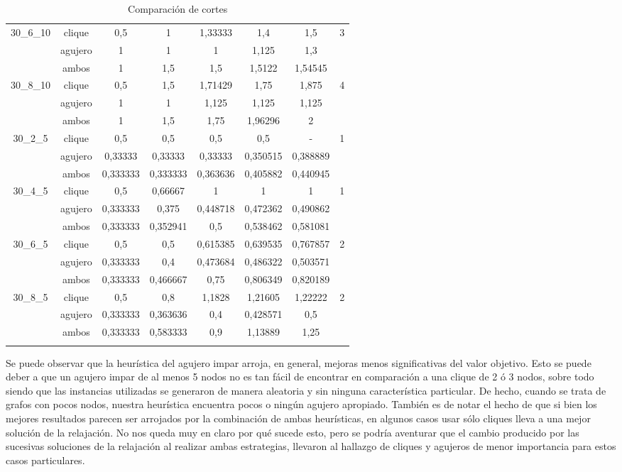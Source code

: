 \documentclass[a4paper]{article}
\begin{document}
\begin{center}
\begin{longtable}{|c|c|c|c|c|c|c|c|}
\hline
30_6_10&clique&0,5&1&1,33333&1,4&1,5&3\\
\cline{2-7}
&agujero&1&1&1&1,125&1,3&\\
\cline{2-7}
&ambos&1&1,5&1,5&1,5122&1,54545&\\
\hline
30_8_10&clique&0,5&1,5&1,71429&1,75&1,875&4\\
\cline{2-7}
&agujero&1&1&1,125&1,125&1,125&\\
\cline{2-7}
&ambos&1&1,5&1,75&1,96296&2&\\
\hline
30_2_5&clique&0,5&0,5&0,5&0,5&-&1\\
\cline{2-7}
&agujero&0,33333&0,33333&0,33333&0,350515&0,388889&\\
\cline{2-7}
&ambos&0,333333&0,333333&0,363636&0,405882&0,440945&\\
\hline
30_4_5&clique&0,5&0,66667&1&1&1&1\\
\cline{2-7}
&agujero&0,333333&0,375&0,448718&0,472362&0,490862&\\
\cline{2-7}
&ambos&0,333333&0,352941&0,5&0,538462&0,581081&\\
\hline
30_6_5&clique&0,5&0,5&0,615385&0,639535&0,767857&2\\
\cline{2-7}
&agujero&0,333333&0,4&0,473684&0,486322&0,503571&\\
\cline{2-7}
&ambos&0,333333&0,466667&0,75&0,806349&0,820189&\\
\hline
30_8_5&clique&0,5&0,8&1,1828&1,21605&1,22222&2\\
\cline{2-7}
&agujero&0,333333&0,363636&0,4&0,428571&0,5&\\
\cline{2-7}
&ambos&0,333333&0,583333&0,9&1,13889&1,25&\\
\hline
\caption{Comparación de cortes}\label{tab:cortes}
\end{longtable}
\end{center}

Se puede observar que la heurística del agujero impar arroja, en general, mejoras menos significativas del valor objetivo. Esto se puede deber a que un agujero impar de al menos 5 nodos no es tan fácil de encontrar en comparación a una clique de 2 ó 3 nodos, sobre todo siendo que las instancias utilizadas se generaron de manera aleatoria y sin ninguna característica particular.  De hecho, cuando se trata de grafos con pocos nodos, nuestra heurística encuentra pocos o ningún agujero apropiado. También es de notar el hecho de que si bien los mejores resultados parecen ser arrojados por la combinación de ambas heurísticas, en algunos casos usar sólo cliques lleva a una mejor solución de la relajación. No nos queda muy en claro por qué sucede esto, pero se podría aventurar que el cambio producido por las sucesivas soluciones de la relajación al realizar ambas estrategias, llevaron al hallazgo de cliques y agujeros de menor importancia para estos casos particulares.
\end{document}
